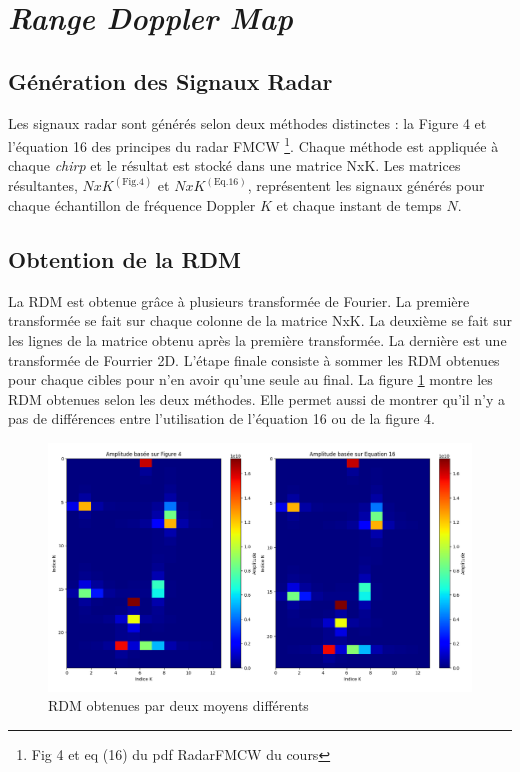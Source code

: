 \section{\textit{Range Doppler Map}}

\subsection{Génération des Signaux Radar}

Les signaux radar sont générés selon deux méthodes distinctes : la Figure 4 et l'équation 16 des principes du radar FMCW \footnote{Fig 4 et eq (16) du pdf RadarFMCW du cours}. Chaque méthode est appliquée à chaque \textit{chirp} et le résultat est stocké dans une matrice NxK. Les matrices résultantes, \(NxK^{(\text{Fig.4})}\) et \(NxK^{(\text{Eq.16})}\), représentent les signaux générés pour chaque échantillon de fréquence Doppler \(K\) et chaque instant de temps \(N\). 

\subsection {Obtention de la RDM}

La RDM est obtenue grâce à plusieurs transformée de Fourier. La première transformée se fait sur chaque colonne de la matrice NxK. La deuxième se fait sur les lignes de la matrice obtenu après la première transformée. La dernière est une transformée de Fourrier 2D. L'étape finale consiste à sommer les RDM obtenues pour chaque cibles pour n'en avoir qu'une seule au final. La figure \ref{fig:RDM_2_ways} montre les RDM obtenues selon les deux méthodes. Elle permet aussi de montrer qu'il n'y a pas de différences entre l'utilisation de l'équation 16 ou de la figure 4. 

\begin{figure}[H]
  \centering
  \includegraphics[scale =0.4]{Pictures/RDM_P_SST.png}
    \caption{RDM obtenues par deux moyens différents}
    \label{fig:RDM_2_ways}
\end{figure}

